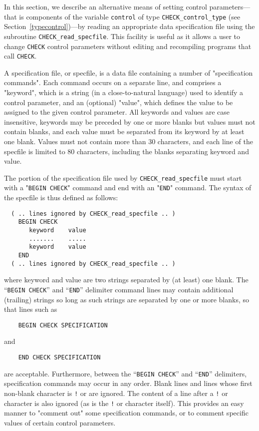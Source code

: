 \documentclass{galahad}
\newcommand{\packagename}{CHECK}
\begin{document}

\galfeatures
\noindent In this section, we describe an alternative means of setting 
control parameters---that is components of the variable {\tt control} of type
{\tt \packagename\_control\_type}
(see Section~\ref{typecontrol})---by reading an appropriate data specification file using the
subroutine {\tt \packagename\_read\_specfile}. This facility
is useful as it allows a user to change  {\tt \packagename} control parameters 
without editing and recompiling programs that call {\tt \packagename}.

A specification file, or specfile, is a data file containing a number of 
"specification commands". Each command occurs on a separate line, 
and comprises a "keyword", 
which is a string (in a close-to-natural language) used to identify a 
control parameter, and 
an (optional) "value", which defines the value to be assigned to the given
control parameter. All keywords and values are case insensitive, 
keywords may be preceded by one or more blanks but
values must not contain blanks, and
each value must be separated from its keyword by at least one blank.
Values must not contain more than 30 characters, and 
each line of the specfile is limited to 80 characters,
including the blanks separating keyword and value.

The portion of the specification file used by 
{\tt \packagename\_read\_specfile}
must start
with a "{\tt BEGIN \packagename}" command and end with an 
"{\tt END}" command.  The syntax of the specfile is thus defined as follows:
\begin{verbatim}
  ( .. lines ignored by CHECK_read_specfile .. )
    BEGIN CHECK
       keyword    value
       .......    .....
       keyword    value
    END 
  ( .. lines ignored by CHECK_read_specfile .. )
\end{verbatim}
where keyword and value are two strings separated by (at least) one blank.
The ``{\tt BEGIN \packagename}'' and ``{\tt END}'' delimiter command lines 
may contain additional (trailing) strings so long as such strings are 
separated by one or more blanks, so that lines such as
\begin{verbatim}
    BEGIN CHECK SPECIFICATION
\end{verbatim}
and
\begin{verbatim}
    END CHECK SPECIFICATION
\end{verbatim}
are acceptable. Furthermore, 
between the
``{\tt BEGIN \packagename}'' and ``{\tt END}'' delimiters,
specification commands may occur in any order.  Blank lines and
lines whose first non-blank character is {\tt !} or {\tt *} are ignored. 
The content 
of a line after a {\tt !} or {\tt *} character is also 
ignored (as is the {\tt !} or {\tt *}
character itself). This provides an easy manner to "comment out" some 
specification commands, or to comment specific values 
of certain control parameters.  
\end{document}
